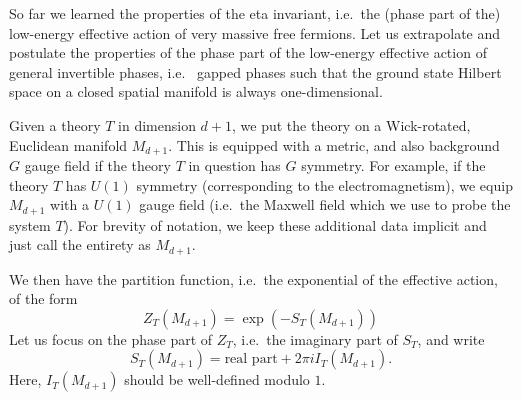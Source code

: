 \documentclass[12pt]{article}
\numberwithin{equation}{section}
\numberwithin{figure}{section}
\theoremstyle{remark}
\begin{document}
So far we learned the properties of the eta invariant, 
i.e.~the (phase part of the) low-energy effective action
of very massive free fermions.
Let us extrapolate and postulate the properties of 
the phase part of the low-energy effective action of 
general invertible phases, i.e.~ gapped phases such that the ground state Hilbert space 
on a closed spatial manifold is always one-dimensional.

Given a theory $T$ in dimension $d+1$, we put the theory on a Wick-rotated, Euclidean manifold $M_{d+1}$.
This is equipped with a metric, and also background $G$  gauge field if the theory $T$ in question
has $G$ symmetry.
For example, if the theory $T$ has $U(1)$ symmetry (corresponding to the electromagnetism),
we equip $M_{d+1}$ with a $U(1)$ gauge field (i.e.~the Maxwell field which we use to probe the system $T$).
For brevity of notation, we keep these additional data implicit and just call the entirety as $M_{d+1}$.

We then have the partition function, i.e.~the exponential of the effective action, of the form \begin{equation}
Z_T(M_{d+1})=\exp( - S_T(M_{d+1})) 
\end{equation} Let us focus on the phase part of $Z_T$, i.e.~the imaginary part of $S_T$, and write \begin{equation}
S_T(M_{d+1}) = \text{real part} + 2\pi i I_T(M_{d+1}).
\end{equation}
Here, $I_T(M_{d+1})$ should be well-defined modulo $1$.
\end{document}
